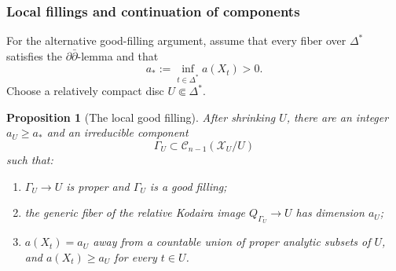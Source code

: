 \documentclass[11pt]{amsart}
\numberwithin{equation}{section}
\theoremstyle{plain}
\newtheorem{prop}[thm]{Proposition}
\theoremstyle{definition}
\newcommand{\cC}{\mathcal C}
\newcommand{\cX}{\mathcal X}
\begin{document}
\subsubsection{Local fillings and continuation of components}
For the alternative good-filling argument, assume that every fiber
over $\Delta^*$ satisfies the $\partial\bar\partial$-lemma and that
\[
 a_*:=\inf_{t\in\Delta^*}a(X_t)>0.
\]
Choose a relatively compact disc $U\Subset\Delta^*$.

\begin{prop}[The local good filling]\label{prop:revised-local-filling}
After shrinking $U$, there are an integer $a_U\ge a_*$ and an irreducible component
\begin{equation*}
 \Gamma_U\subset\cC_{n-1}(\cX_U/U)
\end{equation*}
such that:
\begin{enumerate}[$(i)$]
\item $\Gamma_U\to U$ is proper and $\Gamma_U$ is a good filling;
\item the generic fiber of the relative Kodaira image
$Q_{\Gamma_U}\to U$ has dimension $a_U$;
\item $a(X_t)=a_U$ away from a countable union of proper analytic subsets
of $U$, and $a(X_t)\ge a_U$ for every $t\in U$.
\end{enumerate}
\end{prop}
\end{document}
